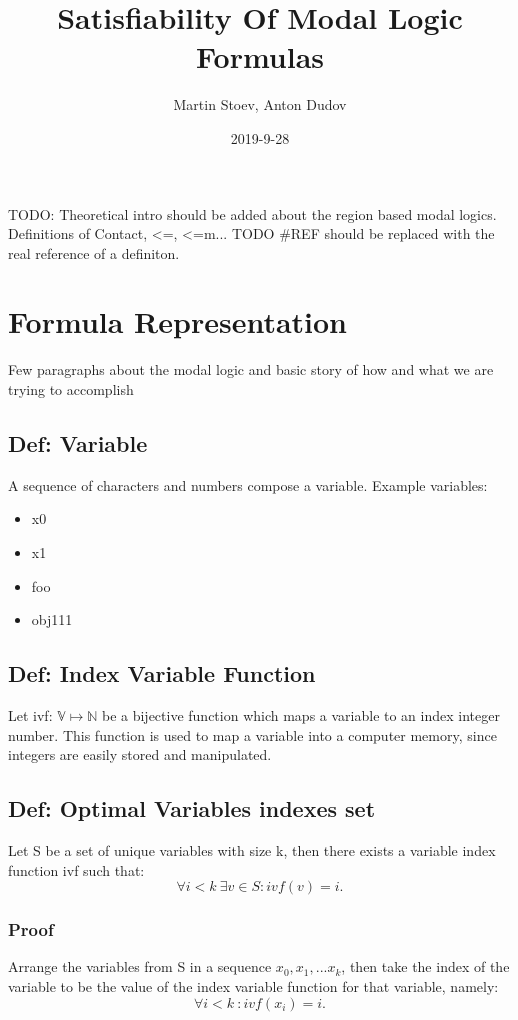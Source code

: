 \documentclass{article}
\title{Satisfiability Of Modal Logic Formulas}
\date{2019-9-28}
\author{Martin Stoev, Anton Dudov}
\begin{document}
	\maketitle
	\newpage

	\tableofcontents

	\newpage
	TODO: Theoretical intro should be added about the region based modal logics.
	Definitions of Contact, <=, <=m...
	\newline
	TODO \#REF should be replaced with the real reference of a definiton.
	\newpage
	\section{Formula Representation}
	Few paragraphs about the modal logic and basic story of how and what we are trying to accomplish	
	\subsection*{Def: Variable}
		A sequence of characters and numbers compose a variable.
	\newline
	\newline
	Example variables:
	\begin{itemize}
		\item x0
		\item x1
		\item foo
		\item obj111
	\end{itemize} 
	\subsection*{Def: Index Variable Function} 
		Let ivf: $\mathbb{V} \longmapsto \mathbb{N}$ be a bijective function which maps a variable to an index integer number. This function is used to map a variable into a 
		computer memory, since integers are easily stored and manipulated.
	\subsection*{Def: Optimal Variables indexes set}
		Let S be a set of unique variables with size k, then there exists a variable index function ivf such that:
		\begin{equation}
			\forall i < k \: \exists v \in S: ivf(v) = i.
		\end{equation}

		\subsubsection*{Proof}
			Arrange the variables from S in a sequence $x_0, x_1, ... x_k$, then take the index of the variable to be 
			the value of the index variable function for that variable, namely:
			\begin{equation}
				\forall i < k \: : ivf(x_i) = i.
			\end{equation}
\end{document}
